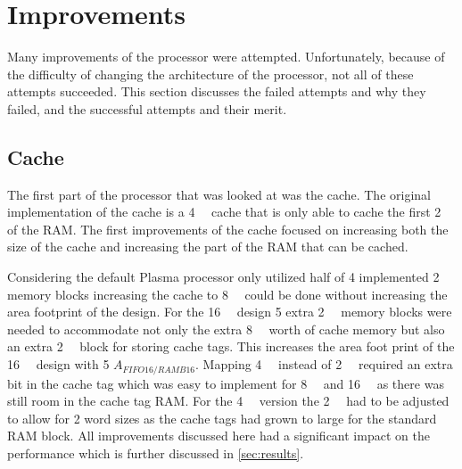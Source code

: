 \documentclass[final]{article}
\begin{document}
\section{Improvements}
Many improvements of the processor were attempted. Unfortunately, because of the difficulty of changing the architecture of the processor, not all of these attempts succeeded. This section discusses the failed attempts and why they failed, and the successful attempts and their merit.

\subsection{Cache}
The first part of the processor that was looked at was the cache. The original implementation of the cache is a \SI{4}{\kibi\byte} cache that is only able to cache the first \SI{2}{\mega\byte} of the RAM. The first improvements of the cache focused on increasing both the size of the cache and increasing the part of the RAM that can be cached. 

Considering the default Plasma processor only utilized half of 4 implemented \SI{2}{\kibi\byte} memory blocks increasing the cache to \SI{8}{\kibi\byte} could be done without increasing the area footprint of the design. For the \SI{16}{\kibi\byte} design 5 extra \SI{2}{\kibi\byte} memory blocks were needed to accommodate not only the extra \SI{8}{\kibi\byte} worth of cache memory but also an extra \SI{2}{\kibi\byte} block for storing cache tags. This increases the area foot print of the \SI{16}{\kibi\byte} design with 5 $A_{FIFO16/RAMB16}$. Mapping \SI{4}{\mega\byte} instead of \SI{2}{\mega\byte} required an extra bit in the cache tag which was easy to implement for \SI{8}{\kibi\byte} and \SI{16}{\kibi\byte} as there was still room in the cache tag RAM. For the \SI{4}{\kibi\byte} version the \SI{2}{\kibi\byte} had to be adjusted to allow for \SI{2}{\byte} word sizes as the cache tags had grown to large for the standard RAM block. All improvements discussed here had a significant impact on the performance which is further discussed in \cref{sec:results}.
\end{document}
